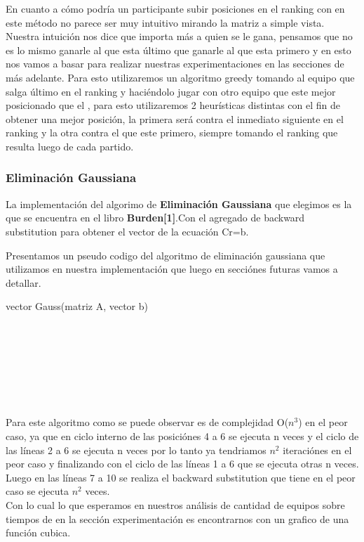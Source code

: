 En cuanto a cómo podría un participante subir posiciones en el ranking con en este método no parece ser muy intuitivo mirando la matriz a simple vista. Nuestra intuición nos dice que importa más a quien se le gana, pensamos que no es lo mismo ganarle al que esta último que ganarle al que esta primero
y en esto nos vamos a basar para realizar nuestras experimentaciones en las secciones de más adelante.
Para esto utilizaremos un algoritmo greedy tomando al equipo que salga último en el ranking y haciéndolo jugar con otro equipo que este mejor posicionado que el , para esto utilizaremos 2 heurísticas distintas
con el fin de obtener una mejor posición, la primera será contra el inmediato siguiente en el ranking y la otra contra el que este primero, siempre tomando el ranking que resulta luego de cada partido.

\subsubsection{Eliminación Gaussiana}
La implementación del algorimo de \textbf{Eliminación Gaussiana} que elegimos es la que se encuentra en el libro \textbf{Burden[1]}.Con el agregado de backward substitution para 
obtener el vector de la ecuaci\'on Cr=b.

Presentamos un pseudo codigo del algoritmo de eliminaci\'on gaussiana que utilizamos en nuestra implementaci\'on que luego en secci\'ones futuras vamos a detallar.

\begin{algorithm}
    \begin{algorithmic}[1]\parskip=2mm
        \caption{vector Gauss(matriz A, vector b)}
        \\
        \\
        \\
        \\
        \\
        \\
    \end{algorithmic}
\end{algorithm}


Para este algoritmo como se puede observar es de complejidad O($n^3$) en el peor caso, ya que en ciclo interno de las posici\'ones 4 a 6 se ejecuta n veces
y el ciclo de las l\'ineas 2 a 6 se ejecuta n veces por lo tanto ya tendriamos $n^2$ iteraci\'ones en el peor caso y finalizando con el ciclo de las l\'ineas 1 a 6 que se ejecuta otras n veces.
Luego en las l\'ineas 7 a 10 se realiza el backward substitution que tiene en el peor caso se ejecuta $n^2$ veces.\\
Con lo cual lo que esperamos en nuestros an\'alisis de cantidad de equipos sobre tiempos de en la secci\'on experimentaci\'on es encontrarnos con un grafico de una funci\'on cubica.


